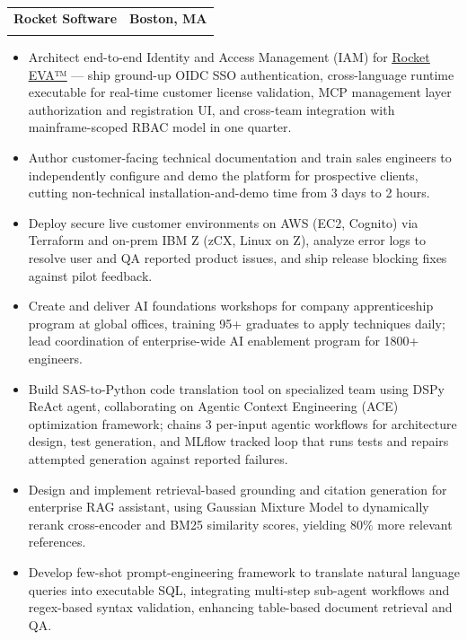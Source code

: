 \documentclass[letterpaper,11pt]{article}
\makeatletter
\newcommand{\resumeSubheading}[4]{
  \vspace{-2pt}\item
    \begin{tabular*}{1.0\textwidth}[t]{l@{\extracolsep{\fill}}r}
      \textbf{#1} & \textbf{\small #2} \\
      \hspace{12pt}\text{#3} & \text{\small #4} \\
      
    \end{tabular*}\vspace{-7pt}
}
\newcommand{\resumeItemListStart}{\begin{itemize}[itemsep=-1pt, parsep=2pt]}
\newcommand{\resumeItemListEnd}{\end{itemize}\vspace{-9pt}}
\newcommand{\resumeItem}[1]{\item\small{#1}}
\makeatother
\begin{document}
    \resumeSubheading
      {Rocket Software} {Boston, MA} 
      {Machine Learning Software Engineer III}{09/2024 -- Present}
      \resumeItemListStart
        \resumeItem{Architect end-to-end Identity and Access Management (IAM) for \href{https://www.rocketsoftware.com/en-us/products/eva}{\underline{Rocket EVA™}} — ship ground-up OIDC SSO authentication, cross-language runtime executable for real-time customer license validation, MCP management layer authorization and registration UI, and cross-team integration with mainframe-scoped RBAC model in one quarter.}
        \resumeItem{Author customer-facing technical documentation and train sales engineers to independently configure and demo the platform for prospective clients, cutting non-technical installation-and-demo time from 3 days to 2 hours.}
        \resumeItem{Deploy secure live customer environments on AWS (EC2, Cognito) via Terraform and on-prem IBM Z (zCX, Linux on Z), analyze error logs to resolve user and QA reported product issues, and ship release blocking fixes against pilot feedback.}
        \resumeItem{Create and deliver AI foundations workshops for company apprenticeship program at global offices, training 95+ graduates to apply techniques daily; lead coordination of enterprise-wide AI enablement program for 1800+ engineers.}
        \resumeItem{Build SAS-to-Python code translation tool on specialized team using DSPy ReAct agent, collaborating on Agentic Context Engineering (ACE) optimization framework; chains 3 per-input agentic workflows for architecture design, test generation, and MLflow tracked loop that runs tests and repairs attempted generation against reported failures.}
        \resumeItem{Design and implement retrieval-based grounding and citation generation for enterprise RAG assistant, using Gaussian Mixture Model to dynamically rerank cross-encoder and BM25 similarity scores, yielding 80\% more relevant references.}
        \resumeItem{Develop few-shot prompt-engineering framework to translate natural language queries into executable SQL, integrating multi-step sub-agent workflows and regex-based syntax validation, enhancing table-based document retrieval and QA.}
      \resumeItemListEnd 
\end{document}
